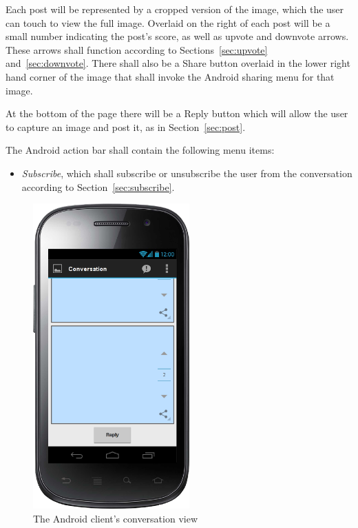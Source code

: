 \documentclass[11pt]{scrartcl}
\begin{document}
        Each post will be represented by a cropped version of the image, which the user can touch to view the full image.
        Overlaid on the right of each post will be a small number indicating the post's score, as well as upvote and downvote arrows.
        These arrows shall function according to Sections~\ref{sec:upvote} and~\ref{sec:downvote}.
        There shall also be a Share button overlaid in the lower right hand corner of the image that shall invoke the Android sharing menu for that image.

        At the bottom of the page there will be a Reply button which will allow the user to capture an image and post it, as in Section~\ref{sec:post}.

        The Android action bar shall contain the following menu items:

        \begin{itemize}
            \item \emph{Subscribe}, which shall subscribe or unsubscribe the user from the conversation according to Section~\ref{sec:subscribe}.
        \end{itemize}

        \begin{figure}[h]
            \centering \includegraphics[width=6cm,keepaspectratio]{mockups/conversation-view}
            \caption{The Android client's conversation view}
            \label{fig:conversationscreen}
        \end{figure}
\end{document}
